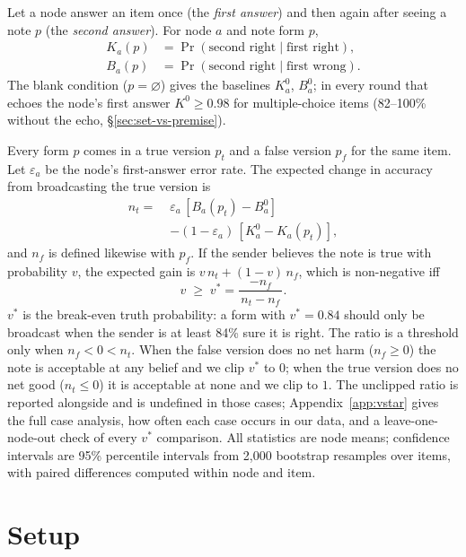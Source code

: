 \documentclass[11pt]{article}
\begin{document}
Let a node answer an item once (the \emph{first answer}) and then again after seeing a note $p$ (the \emph{second answer}). For node $a$ and note form $p$,
\begin{align*}
K_a(p)&=\Pr(\text{second right}\mid \text{first right}),\\
B_a(p)&=\Pr(\text{second right}\mid \text{first wrong}).
\end{align*}
The blank condition ($p=\varnothing$) gives the baselines $K_a^0$, $B_a^0$; in every round that echoes the node's first answer $K^0\ge 0.98$ for multiple-choice items (82--100\% without the echo, \S\ref{sec:set-vs-premise}).

Every form $p$ comes in a true version $p_t$ and a false version $p_f$ for the same item. Let $\varepsilon_a$ be the node's first-answer error rate. The expected change in accuracy from broadcasting the true version is
\begin{align*}
n_t = \;&\varepsilon_a\,[B_a(p_t)-B_a^0]\\&-(1-\varepsilon_a)\,[K_a^0-K_a(p_t)],
\end{align*}
and $n_f$ is defined likewise with $p_f$. If the sender believes the note is true with probability $v$, the expected gain is $v\,n_t+(1-v)\,n_f$, which is non-negative iff
\[
v\;\ge\;v^\ast = \frac{-n_f}{\,n_t-n_f\,}.
\]
$v^\ast$ is the break-even truth probability: a form with $v^\ast=0.84$ should only be broadcast when the sender is at least 84\% sure it is right. The ratio is a threshold only when $n_f<0<n_t$. When the false version does no net harm ($n_f\ge0$) the note is acceptable at any belief and we clip $v^\ast$ to $0$; when the true version does no net good ($n_t\le0$) it is acceptable at none and we clip to $1$. The unclipped ratio is reported alongside and is undefined in those cases; Appendix~\ref{app:vstar} gives the full case analysis, how often each case occurs in our data, and a leave-one-node-out check of every $v^\ast$ comparison. All statistics are node means; confidence intervals are 95\% percentile intervals from 2{,}000 bootstrap resamples over items, with paired differences computed within node and item.

\section{Setup}\label{sec:setup}
\end{document}
